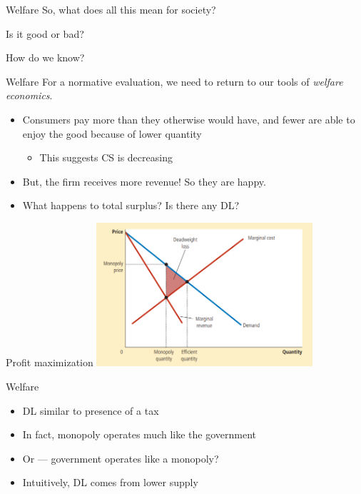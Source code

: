 \documentclass[aspectratio=169]{beamer}
\begin{document}
\begin{frame}{Welfare}
    So, what does all this mean for society?

    \vspace{2mm}

    Is it good or bad? 

    \vspace{2mm}

    How do we know?
\end{frame}

\begin{frame}{Welfare}
    For a normative evaluation, we need to return to our tools of \textit{welfare economics}.

    \begin{itemize}
        \item Consumers pay more than they otherwise would have, and fewer are able to enjoy the good because of lower quantity
        \begin{itemize}
            \item This suggests CS is decreasing
        \end{itemize}
        \item But, the firm receives more revenue! So they are happy.
        \item What happens to total surplus? Is there any DL?
    \end{itemize}
\end{frame}

\begin{frame}{Profit maximization}
    \centering
    \includegraphics[width = 0.6\textwidth,keepaspectratio]{
     DL.png}
\end{frame}

\begin{frame}{Welfare}
    \begin{itemize}
        \item DL similar to presence of a tax
        \item In fact, monopoly operates much like the government
        \item Or --- government operates like a monopoly?
        \item Intuitively, DL comes from lower supply
    \end{itemize}
\end{frame}
\end{document}
